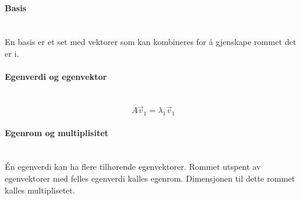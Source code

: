 \paragraph{Basis} \mbox{} \\
En basis er et set med vektorer som kan kombineres for å
gjenskape rommet det er i.

\paragraph{Egenverdi og egenvektor} \mbox{} \\
$$A\vec{v}_1 = \lambda_1 \vec{v}_1$$

\paragraph{Egenrom og multiplisitet} \mbox{} \\
Én egenverdi kan ha flere tilhørende egenvektorer.
Rommet utspent av egenvektorer med felles egenverdi kalles egenrom.
Dimensjonen til dette rommet kalles multiplisetet.
